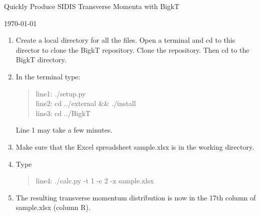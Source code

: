 \documentclass[12pt]{article}
\newcommand{\rquote}[1]{\textcolor{red}{ \begin{quote} #1 \end{quote}}}
\newcommand\3[1]{\boldsymbol{#1}}
\begin{document}
\centerline{Quickly Produce SIDIS Transverse Momenta with BigkT}
\centerline{\today}
\vspace{.25in}
\begin{enumerate}
\item Create a local directory for all the files. Open a terminal and cd to this director to clone the BigkT repository. Clone the repository. Then cd to the BigkT directory.
\item In the terminal type:
\rquote{
line1:  ./setup.py \\
line2:  cd ../external \&\& ./install \\
line3:  cd ../BigkT} 
Line 1 may take a few minutes.
\item Make sure that the Excel spreadsheet sample.xlsx is in the working directory. 
\item Type
\rquote{
line4:  ./calc.py  -t 1 -c 2 -x sample.xlsx} 
\item The resulting transverse momentum distribution is now in the 17th column of sample.xlsx (column R).
\end{enumerate}
\end{document}
